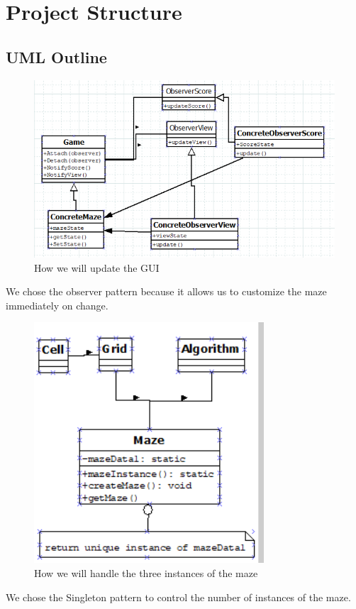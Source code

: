 \documentclass[10pt,conference,onecolumn,compsoc]{IEEEtran}
\begin{document}
\section{Project Structure}
\subsection{UML Outline}
\begin{figure}[ht!]
\includegraphics[scale=.5]{Observer.png}
\caption{How we will update the GUI}
\label{Game play}
\end{figure}
We chose the observer pattern because it allows us to customize the maze immediately on change.
\begin{figure}[ht!]
\includegraphics[scale=.5]{Singleton.png}
\caption{How we will handle the three instances of the maze}
\label{Maze instance}
\end{figure}
We chose the Singleton pattern to control the number of instances of the maze.
\clearpage
\end{document}
